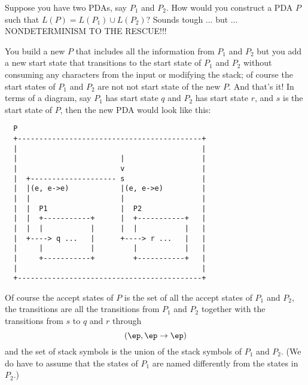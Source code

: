 \newpage


\newpage
\begin{eg}
Suppose you have two PDAs, say $P_1$ and $P_2$.
How would you construct a PDA $P$ such that $L(P) = L(P_1) \cup L(P_2)$?
Sounds tough ... but ... NONDETERMINISM TO THE RESCUE!!!

You build a new $P$ that includes all the information from $P_1$ and $P_2$
but you add a new start state that transitions to the start state of $P_1$
and $P_2$ without consuming any characters from the input or modifying the
stack; of course the start states of $P_1$ and $P_2$ are not not start
state of the new $P$.
And that's it! In terms of a diagram, say $P_1$ has start state $q$ and
$P_2$ has start state $r$, and $s$ is the start state of $P$, then the new
PDA would look like this:

\begin{samepage}
\begin{verbatim}
  P
  +-------------------------------------------+
  |                                           |
  |                        |                  |
  |                        v                  |
  |  +-------------------- s                  |
  |  |(e, e->e)            |(e, e->e)         |
  |  |                     |                  |
  |  |  P1                 |  P2              |
  |  |  +-----------+      |  +-----------+   |
  |  |  |           |      |  |           |   |
  |  +----> q ...   |      +----> r ...   |   |
  |     |           |         |           |   |
  |     +-----------+         +-----------+   |
  |                                           |
  +-------------------------------------------+
\end{verbatim}
\end{samepage}

Of course the accept states of $P$ is the set of all the accept states of
$P_1$ and $P_2$, the transitions are all the transitions from $P_1$ and
$P_2$ together with the transitions from $s$ to $q$ and $r$ through
\[
(\ep, \ep \rightarrow \ep)
\]
and the set of stack symbols is the union of the stack symbols of $P_1$
and $P_2$.
(We do have to assume that the states of $P_1$ are named differently from
the states in $P_2$.)
\end{eg}

